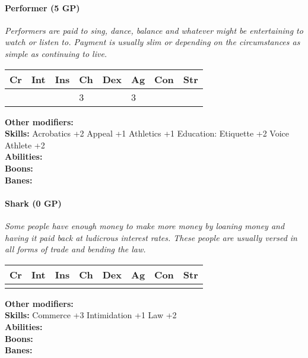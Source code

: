 \documentclass[12pt,a4paper,openany]{book}
\begin{document}
	\hrulefill
	\paragraph*{Performer (5 GP)}
	\textit{Performers are paid to sing, dance, balance and whatever might be entertaining to watch or listen to. Payment is usually slim or depending on the circumstances as simple as continuing to live.}\par
	\begin{tabular}{|l|l|l|l|l|l|l|l|}
		\hline
		Cr & Int & Ins & Ch & Dex & Ag & Con & Str \\ \hline
		&  &  & 3 &  & 3 &  &  \\ \hline
	\end{tabular}\par
	\noindent\textbf{Other modifiers:} \\
	\textbf{Skills:} Acrobatics +2
	Appeal +1
	Athletics +1
	Education: Etiquette +2
	Voice Athlete +2\\
	\textbf{Abilities:} \\
	\textbf{Boons:} \\
	\textbf{Banes:} \\
	
	\hrulefill
	\paragraph*{Shark (0 GP)}
	\textit{Some people have enough money to make more money by loaning money and having it paid back at ludicrous interest rates. These people are usually versed in all forms of trade and bending the law.}\par
	\begin{tabular}{|l|l|l|l|l|l|l|l|}
		\hline
		Cr & Int & Ins & Ch & Dex & Ag & Con & Str \\ \hline
		&  &  &  &  &  &  &  \\ \hline
	\end{tabular}\par
	\noindent\textbf{Other modifiers:} \\
	\textbf{Skills:} Commerce +3
	Intimidation +1
	Law +2\\
	\textbf{Abilities:} \\
	\textbf{Boons:} \\
	\textbf{Banes:} \\
	
	\hrulefill
\end{document}
